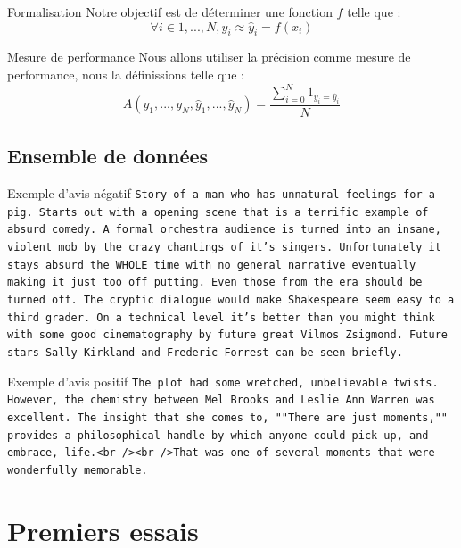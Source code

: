 \documentclass{beamer}
\begin{document}
\begin{frame}
\begin{block}{Formalisation}
Notre objectif est de déterminer une fonction $f$ telle que : 
$$
\forall i \in {1, ..., N}, y_{i} \approx \hat{y}_{i} = f(x_{i})
$$
\end{block}

\begin{block}{Mesure de performance}
Nous allons utiliser la précision comme mesure de performance, nous la définissions telle que :
$$
A(y_{1}, ..., y_{N}, \hat{y}_{1}, ..., \hat{y}_{N}) = \frac{\sum_{i=0}^{N}{1_{y_{i}=\hat{y}_{i}}}}{N}$$
\end{block}
\end{frame}

\subsection{Ensemble de données}

\begin{frame}
\begin{block}{Exemple d'avis négatif}
\texttt{Story of a man who has unnatural feelings for a pig. Starts out with a opening scene that is a terrific example of absurd comedy. A formal orchestra audience is turned into an insane, violent mob by the crazy chantings of it's singers. Unfortunately it stays absurd the WHOLE time with no general narrative eventually making it just too off putting. Even those from the era should be turned off. The cryptic dialogue would make Shakespeare seem easy to a third grader. On a technical level it's better than you might think with some good cinematography by future great Vilmos Zsigmond. Future stars Sally Kirkland and Frederic Forrest can be seen briefly.}
\end{block}
\end{frame}

\begin{frame}
\begin{block}{Exemple d'avis positif}
\texttt{The plot had some wretched, unbelievable twists. However, the chemistry between Mel Brooks and Leslie Ann Warren was excellent. The insight that she comes to, ""There are just moments,"" provides a philosophical handle by which anyone could pick up, and embrace, life.<br /><br />That was one of several moments that were wonderfully memorable.}
\end{block}
\end{frame}

\section{Premiers essais}
\end{document}
